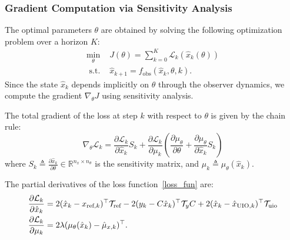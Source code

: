 \subsubsection{Gradient Computation via Sensitivity Analysis}\label{ch4_sec4_1}
The optimal parameters $\theta$ are obtained by solving the following optimization problem over a horizon $K$:
\begin{equation}\label{P_opti}
    \begin{array}{cl}
    \min\limits_{\theta} & J(\theta) = \sum_{k=0}^{K} \mathcal{L}_k(\hat{x}_k(\theta)) \\
    \text { s.t. } &  \hat{x}_{k+1} = f_{\text{obs}}(\hat{x}_k, \theta, k).
    \end{array}
\end{equation}
Since the state $\hat{x}_k$ depends implicitly on $\theta$ through the observer dynamics, we compute the gradient $\nabla_\theta J$ using sensitivity analysis.

The total gradient of the loss at step $k$ with respect to $\theta$ is given by the chain rule:
\begin{equation}
  \nabla_\theta \mathcal{L}_k = 
      \frac{\partial \mathcal{L}_k}{\partial \hat{x}_k} S_k 
      + 
      \frac{\partial \mathcal{L}_k}{\partial \mu_k} \left( \frac{\partial \mu_\theta}{\partial \theta} + \frac{\partial \mu_\theta}{\partial \hat{x}_k} S_k \right)
  \label{eq:total_grad}
\end{equation}
where $S_k \triangleq \frac{\partial \hat{x}_k}{\partial \theta} \in \mathbb{R}^{n_x \times n_\theta}$ is the sensitivity matrix, and $\mu_k \triangleq \mu_\theta(\hat{x}_k)$.

The partial derivatives of the loss function~\eqref{loss_fun} are:
\begin{align}
    \frac{\partial \mathcal{L}_k}{\partial \hat{x}_k} &= 2(\hat{x}_k - x_{\text{ref},k})^\top \mathcal{T}_{\text{ref}} - 2(y_k - C\hat{x}_k)^\top \mathcal{T}_{y} C + 2(\hat{x}_k - \hat{x}_{\text{UIO},k})^\top \mathcal{T}_{\text{uio}} \\
    \frac{\partial \mathcal{L}_k}{\partial \mu_k} &= 2\lambda (\mu_\theta(\hat{x}_k) - \hat{\mu}_{x,k})^\top.
\end{align}

